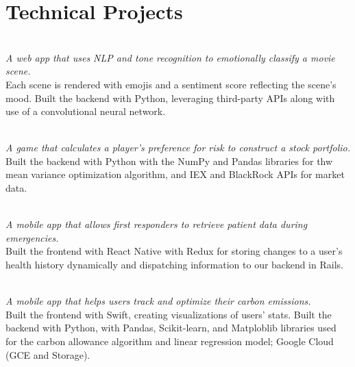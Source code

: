 \documentclass[]{deedy-resume-openfont}
\begin{document}
\begin{minipage}[t]{0.66\textwidth}

\section{Technical Projects}
\href{https://devpost.com/software/emoci}{}\\
\textit{A web app that uses NLP and tone recognition to emotionally classify a movie scene.} \\ Each scene is rendered with emojis and a sentiment score reflecting the scene's mood. Built the backend with Python, leveraging third-party APIs along with use of a convolutional neural network.
\sectionsep

\href{https://devpost.com/software/growthdriver}{}\\
\textit{A game that calculates a player's preference for risk to construct a stock portfolio.} \\ Built the backend with Python with the NumPy and Pandas libraries for thw mean variance optimization algorithm, and IEX and BlackRock APIs for market data.
\sectionsep

\href{https://devpost.com/software/medvault}{}\\
\textit{A mobile app that allows first responders to  retrieve patient data during emergencies.} \\ Built the frontend with React Native with Redux for storing changes to a user's health history dynamically and dispatching information to our backend in Rails.
\sectionsep

\href{https://devpost.com/software/my6footprint}{}\\
\textit{A mobile app that helps users track and optimize their carbon emissions.}\\ Built the frontend with Swift, creating visualizations of users' stats. Built the backend with Python, with Pandas, Scikit-learn, and Matploblib libraries used for the carbon allowance algorithm and linear regression model; Google Cloud (GCE and Storage).
\sectionsep

\end{minipage}
\end{document}

